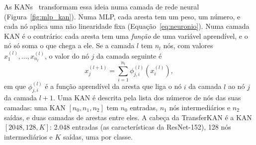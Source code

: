 As \glspl{KAN}~\cite{liu2024kan} transformam essa ideia numa camada de rede neural (Figura~\ref{fig:mlp_kan}). Numa MLP, cada aresta tem um peso, um número, e cada nó aplica uma não linearidade fixa (Equação~\ref{eq:neuronio}). Numa camada KAN é o contrário: cada aresta tem uma \emph{função} de uma variável aprendível, e o nó só soma o que chega a ele. Se a camada $l$ tem $n_l$ nós, com valores $x^{(l)}_1, \ldots, x^{(l)}_{n_l}$, o valor do nó $j$ da camada seguinte é
\begin{equation}
x^{(l+1)}_j = \sum_{i=1}^{n_l} \phi^{(l)}_{j,i}\!\left(x^{(l)}_i\right),
\label{eq:kan_camada}
\end{equation}
em que $\phi^{(l)}_{j,i}$ é a função aprendível da aresta que liga o nó $i$ da camada $l$ ao nó $j$ da camada $l+1$. Uma KAN é descrita pela lista dos números de nós das suas camadas: uma KAN $[n_0, n_1, n_2]$ tem $n_0$ entradas, $n_1$ nós intermediários e $n_2$ saídas, e duas camadas de arestas entre eles. A cabeça da TransferKAN é a KAN $[2048, 128, K]$: 2.048 entradas (as características da ResNet-152), 128 nós intermediários e $K$ saídas, uma por classe.

